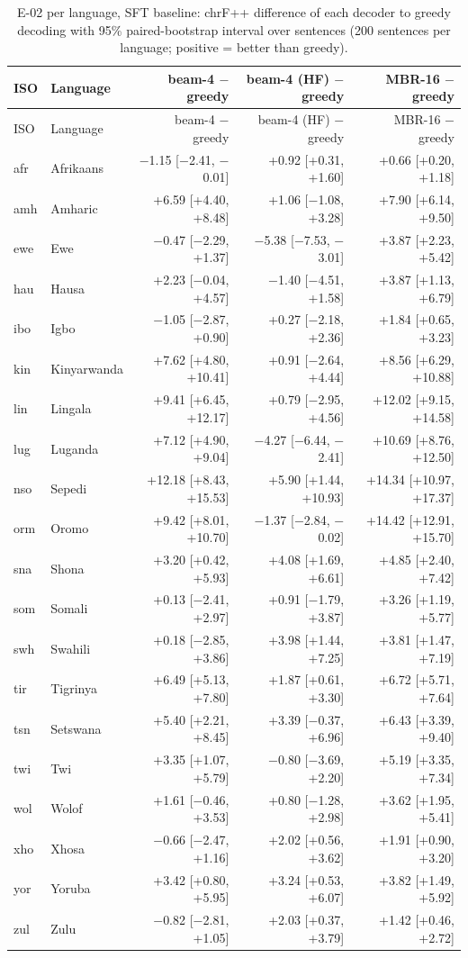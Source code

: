 {\scriptsize\setlength{\tabcolsep}{1.5pt}
\begin{longtable}{@{}llrrr@{}}
\caption{E-02 per language, SFT baseline: chrF++ difference of each decoder to greedy decoding with 95\% paired-bootstrap interval over sentences (200 sentences per language; positive = better than greedy).}\label{tab:dec-d-sft-pp}\\
\toprule
ISO & Language & beam-4 $-$ greedy & beam-4 (HF) $-$ greedy & MBR-16 $-$ greedy \\
\midrule\endfirsthead
\toprule
ISO & Language & beam-4 $-$ greedy & beam-4 (HF) $-$ greedy & MBR-16 $-$ greedy \\
\midrule\endhead
\midrule\endfoot
\bottomrule\endlastfoot
afr & Afrikaans & $-$1.15 [$-$2.41, $-$0.01] & +0.92 [+0.31, +1.60] & +0.66 [+0.20, +1.18] \\
amh & Amharic & +6.59 [+4.40, +8.48] & +1.06 [$-$1.08, +3.28] & +7.90 [+6.14, +9.50] \\
ewe & Ewe & $-$0.47 [$-$2.29, +1.37] & $-$5.38 [$-$7.53, $-$3.01] & +3.87 [+2.23, +5.42] \\
hau & Hausa & +2.23 [$-$0.04, +4.57] & $-$1.40 [$-$4.51, +1.58] & +3.87 [+1.13, +6.79] \\
ibo & Igbo & $-$1.05 [$-$2.87, +0.90] & +0.27 [$-$2.18, +2.36] & +1.84 [+0.65, +3.23] \\
kin & Kinyarwanda & +7.62 [+4.80, +10.41] & +0.91 [$-$2.64, +4.44] & +8.56 [+6.29, +10.88] \\
lin & Lingala & +9.41 [+6.45, +12.17] & +0.79 [$-$2.95, +4.56] & +12.02 [+9.15, +14.58] \\
lug & Luganda & +7.12 [+4.90, +9.04] & $-$4.27 [$-$6.44, $-$2.41] & +10.69 [+8.76, +12.50] \\
nso & Sepedi & +12.18 [+8.43, +15.53] & +5.90 [+1.44, +10.93] & +14.34 [+10.97, +17.37] \\
orm & Oromo & +9.42 [+8.01, +10.70] & $-$1.37 [$-$2.84, $-$0.02] & +14.42 [+12.91, +15.70] \\
sna & Shona & +3.20 [+0.42, +5.93] & +4.08 [+1.69, +6.61] & +4.85 [+2.40, +7.42] \\
som & Somali & +0.13 [$-$2.41, +2.97] & +0.91 [$-$1.79, +3.87] & +3.26 [+1.19, +5.77] \\
swh & Swahili & +0.18 [$-$2.85, +3.86] & +3.98 [+1.44, +7.25] & +3.81 [+1.47, +7.19] \\
tir & Tigrinya & +6.49 [+5.13, +7.80] & +1.87 [+0.61, +3.30] & +6.72 [+5.71, +7.64] \\
tsn & Setswana & +5.40 [+2.21, +8.45] & +3.39 [$-$0.37, +6.96] & +6.43 [+3.39, +9.40] \\
twi & Twi & +3.35 [+1.07, +5.79] & $-$0.80 [$-$3.69, +2.20] & +5.19 [+3.35, +7.34] \\
wol & Wolof & +1.61 [$-$0.46, +3.53] & +0.80 [$-$1.28, +2.98] & +3.62 [+1.95, +5.41] \\
xho & Xhosa & $-$0.66 [$-$2.47, +1.16] & +2.02 [+0.56, +3.62] & +1.91 [+0.90, +3.20] \\
yor & Yoruba & +3.42 [+0.80, +5.95] & +3.24 [+0.53, +6.07] & +3.82 [+1.49, +5.92] \\
zul & Zulu & $-$0.82 [$-$2.81, +1.05] & +2.03 [+0.37, +3.79] & +1.42 [+0.46, +2.72] \\
\end{longtable}}
